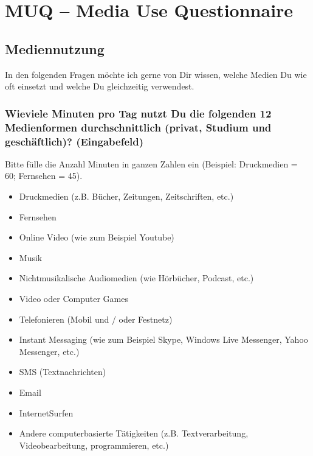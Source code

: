\section{MUQ ­-- Media Use Questionnaire}\label{anhangSection.muq}   
\subsection*{Mediennutzung}    
In den folgenden Fragen möchte ich gerne von Dir wissen, welche Medien Du wie oft einsetzt und welche Du gleichzeitig verwendest.
\subsubsection*{Wieviele Minuten pro Tag nutzt Du die folgenden 12 Medienformen durchschnittlich (privat, Studium und geschäftlich)? (Eingabefeld)}
Bitte fülle die Anzahl Minuten in ganzen Zahlen ein (Beispiel: Druckmedien = 60; Fernsehen = 45).
    \begin{itemize}
      \item Druckmedien (z.B. Bücher, Zeitungen, Zeitschriften, etc.)
      \item Fernsehen
      \item Online Video (wie zum Beispiel Youtube)
      \item Musik
      \item Nicht­musikalische Audiomedien (wie Hörbücher, Podcast, etc.)
      \item Video oder Computer Games
      \item Telefonieren (Mobil­ und / oder Festnetz)
      \item Instant Messaging (wie zum Beispiel Skype, Windows Live Messenger, Yahoo Messenger, etc.)
      \item SMS (Textnachrichten)
      \item Email
      \item Internet­Surfen
      \item Andere computerbasierte Tätigkeiten (z.B. Textverarbeitung, Videobearbeitung, programmieren, etc.)
    \end{itemize} 
